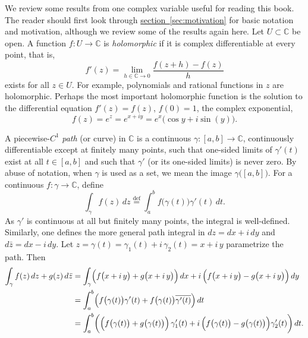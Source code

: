 \documentclass[12pt,openany]{book}
\newcommand{\C}{{\mathbb{C}}}
\theoremstyle{plain}
\theoremstyle{remark}
\theoremstyle{definition}
\theoremstyle{exercise}
\theoremstyle{example}
\newcommand{\sectionref}[1]{\hyperref[#1]{section~\ref*{#1}}}
\begin{document}
We review some results from one complex variable useful for
reading this book.
The reader should first look through \sectionref{sec:motivation}
for basic notation and motivation, although we review some of the
results again here.
Let $U \subset \C$ be open.
A function
$f \colon U \to \C$ is \emph{holomorphic} if it is complex
differentiable at every point, that is,
\begin{equation*}
f'(z) = \lim_{h \in \C \to 0} \frac{f(z+h) - f(z)}{h}
\end{equation*}
exists for all $z \in U$.  For example, polynomials and rational
functions in $z$ are holomorphic.  Perhaps the most important holomorphic
function is the solution to the differential equation $f'(z) = f(z)$, $f(0) = 1$,
the complex exponential,
\begin{equation*}
f(z) = e^z = e^{x+iy} = e^x \bigl( \cos y + i \sin(y) \bigr) .
\end{equation*}


A piecewise-$C^1$ \emph{path} (or curve) in $\C$
is a continuous $\gamma \colon [a,b] \to \C$,
continuously differentiable except at finitely many points,
such that one-sided limits of $\gamma'(t)$ exist at all $t \in [a,b]$
and such that $\gamma'$ (or its one-sided limits) is never zero.
By abuse of notation, when $\gamma$ is used as a set, we mean
the image
$\gamma\bigl([a,b]\bigr)$.
For a continuous $f \colon \gamma \to \C$, define
%
\begin{equation*}
\int_\gamma f(z) \, dz
\overset{\text{def}}{=}
\int_a^b f\bigl(\gamma(t)\bigr) \gamma'(t) \, dt .
\end{equation*}
As $\gamma'$ is continuous at all but finitely many points,
the integral is well-defined.  Similarly, one defines the more general
path integral in $dz = dx + i\,dy$ and $d\bar{z} = dx - i\, dy$.
Let
$z = \gamma(t) = \gamma_1(t) + i \, \gamma_2(t) = x + i\, y$
parametrize the path.  Then
\begin{equation*}
\begin{split}
\int_\gamma f(z) \, dz + g(z) \, d\bar{z}
& =
\int_\gamma
\Bigl(f\bigl(x+i\, y\bigr) + g\bigl(x+i\, y\bigr) \Bigr) \, dx
+
i \, \Bigl( f\bigl(x+i\, y\bigr) - g\bigl(x+i\, y\bigr) \Bigr) \, dy
\\
& =
\int_a^b
\Bigl(
f\bigl(\gamma(t)\bigr) \gamma'(t)
+
f\bigl(\gamma(t)\bigr) \overline{\gamma'(t)}
\Bigr) \, dt
\\
& =
\int_a^b
\biggl(
\Bigl(f\bigl(\gamma(t)\bigr) + g\bigl(\gamma(t)\bigr) \Bigr) \,
\gamma_1'(t)
+
i \, \Bigl( f\bigl(\gamma(t)\bigr) - g\bigl(\gamma(t)\bigr) \Bigr)
\gamma_2'(t)
\biggr)
\, dt .
\end{split}
\end{equation*}
\end{document}
